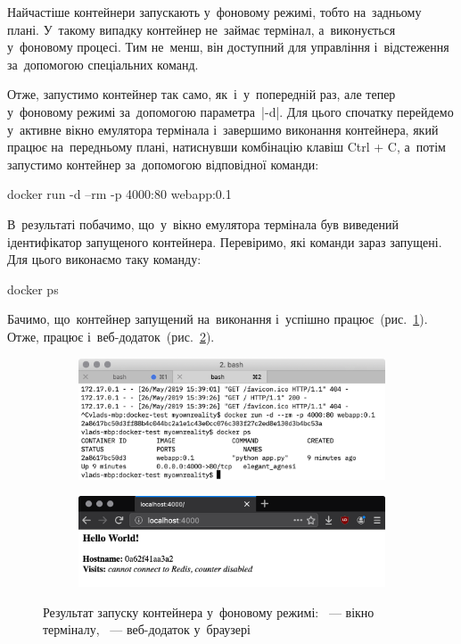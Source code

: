 \documentclass[
	a4paper,
	oneside,
	BCOR = 10mm,
	DIV = 12,
	12pt,
	headings = normal,
]{scrartcl}
\newlength{\gridunitwidth}
\begin{document}
					Найчастіше контейнери запускають у~фоновому режимі, тобто на~задньому плані. У~такому випадку контейнер не~займає термінал, а~виконується у~фоновому процесі. Тим не~менш, він доступний для управління і~відстеження за~допомогою спеціальних команд.
					
					Отже, запустимо контейнер так само, як~і~у~попередній раз, але тепер у~фоновому режимі за~допомогою параметра~\bashinline|-d|. Для цього спочатку перейдемо у~активне вікно емулятора термінала і~завершимо виконання контейнера, який працює на~передньому плані, натиснувши комбінацію клавіш \textenglish{Ctrl + C}, а~потім запустимо контейнер за~допомогою відповідної команди:
					\begin{bashterm}
						docker run -d --rm -p 4000:80 webapp:0.1
					\end{bashterm}
					В~результаті побачимо, що~у~вікно емулятора термінала був виведений ідентифікатор запущеного контейнера. Перевіримо, які команди зараз запущені. Для цього виконаємо таку команду:
					\begin{bashterm}
						docker ps
					\end{bashterm}
					Бачимо, що~контейнер запущений на~виконання і~успішно працює~(рис.~\ref{subfig:docker-run-d-res-term}). Отже, працює і~веб-додаток~(рис.~\ref{subfig:docker-run-d-res-webapp}).

					\begin{figure}[!htbp]
						\centering
						\begin{subfigure}{\columnwidth}
							\centering
							\includegraphics[width=10\gridunitwidth]{./assets/y03s02-syssoft-homework-01-p04a.png}
							\caption{}
							\label{subfig:docker-run-d-res-term}
						\end{subfigure}
						\begin{subfigure}{\columnwidth}
							\centering
							\includegraphics[width=10\gridunitwidth]{./assets/y03s02-syssoft-homework-01-p04b.png}
							\caption{}
							\label{subfig:docker-run-d-res-webapp}
						\end{subfigure}
						\caption{Результат запуску контейнера у~фоновому режимі: ~— вікно терміналу, ~— веб-додаток у~браузері}
						\label{fig:docker-run-d-res}
					\end{figure}
\end{document}
